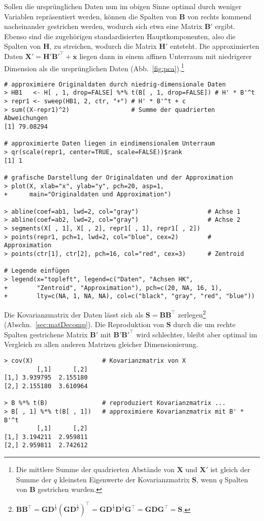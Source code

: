 Sollen die ursprünglichen Daten nun im obigen Sinne optimal durch weniger Variablen repräsentiert werden, können die Spalten von $\bm{B}$ von rechts kommend nacheinander gestrichen werden, wodurch sich etwa eine Matrix $\bm{B}'$ ergibt. Ebenso sind die zugehörigen standardisierten Hauptkomponenten, also die Spalten von $\bm{H}$, zu streichen, wodurch die Matrix $\bm{H}'$ entsteht. Die approximierten Daten $\bm{X}' = \bm{H}' \bm{B}'^{\top} + \overline{\bm{x}}$ liegen dann in einem affinen Unterraum mit niedrigerer Dimension als die ursprünglichen Daten (Abb.\ \ref{fig:pca}).\footnote{Die mittlere Summe der quadrierten Abstände von $\bm{X}$ und $\bm{X}'$ ist gleich der Summe der $q$ kleinsten Eigenwerte der Kovarianzmatrix $\bm{S}$, wenn $q$ Spalten von $\bm{B}$ gestrichen wurden.}
\begin{lstlisting}
# approximiere Originaldaten durch niedrig-dimensionale Daten
> HB1   <- H[ , 1, drop=FALSE] %*% t(B[ , 1, drop=FALSE]) # H' * B'^t
> repr1 <- sweep(HB1, 2, ctr, "+") # H' * B'^t + c
> sum((X-repr1)^2)                 # Summe der quadrierten Abweichungen
[1] 79.08294

# approximierte Daten liegen in eindimensionalem Unterraum
> qr(scale(repr1, center=TRUE, scale=FALSE))$rank
[1] 1

# grafische Darstellung der Originaldaten und der Approximation
> plot(X, xlab="x", ylab="y", pch=20, asp=1,
+      main="Originaldaten und Approximation")

> abline(coef=ab1, lwd=2, col="gray")                   # Achse 1
> abline(coef=ab2, lwd=2, col="gray")                   # Achse 2
> segments(X[ , 1], X[ , 2], repr1[ , 1], repr1[ , 2])
> points(repr1, pch=1, lwd=2, col="blue", cex=2)        # Approximation
> points(ctr[1], ctr[2], pch=16, col="red", cex=3)      # Zentroid

# Legende einfügen
> legend(x="topleft", legend=c("Daten", "Achsen HK",
+        "Zentroid", "Approximation"), pch=c(20, NA, 16, 1),
+        lty=c(NA, 1, NA, NA), col=c("black", "gray", "red", "blue"))
\end{lstlisting}

Die Kovarianzmatrix der Daten lässt sich als $\bm{S} = \bm{B} \bm{B}^{\top}$ zerlegen\footnote{$\bm{B} \bm{B}^{\top} = \bm{G} \bm{D}^{\frac{1}{2}} (\bm{G} \bm{D}^{\frac{1}{2}})^{\top} = \bm{G} \bm{D}^{\frac{1}{2}} \bm{D}^{\frac{1}{2}} \bm{G}^{\top} = \bm{G} \bm{D} \bm{G}^{\top} = \bm{S}$.} (Abschn.\ \ref{sec:matDecomp}). Die Reproduktion von $\bm{S}$ durch die um rechte Spalten gestrichene Matrix $\bm{B}'$ mit $\bm{B}' \bm{B}'^{\top}$ wird schlechter, bleibt aber optimal im Vergleich zu allen anderen Matrizen gleicher Dimensionierung.
\begin{lstlisting}
> cov(X)                   # Kovarianzmatrix von X
         [,1]      [,2]
[1,] 3.939795  2.155180
[2,] 2.155180  3.610964

> B %*% t(B)               # reproduziert Kovarianzmatrix ...
> B[ , 1] %*% t(B[ , 1])   # approximiere Kovarianzmatrix mit B' * B'^t
         [,1]      [,2]
[1,] 3.194211  2.959811
[2,] 2.959811  2.742612
\end{lstlisting}

